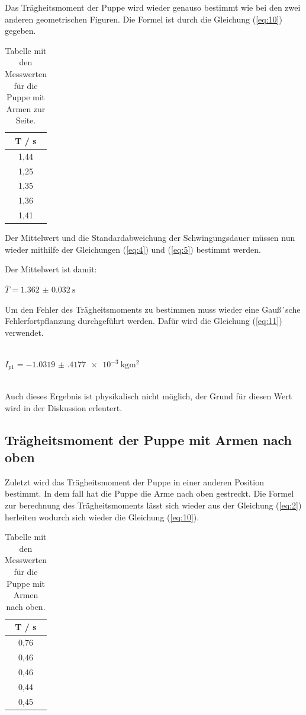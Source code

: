 Das Trägheitsmoment der Puppe wird wieder genauso bestimmt wie bei den zwei anderen
geometrischen Figuren. Die Formel ist durch die Gleichung (\ref{eq:10}) gegeben.


\begin{table}[H]
  \centering
  \caption{Tabelle mit den Messwerten für die Puppe mit Armen zur Seite.}
  \begin{tabular}{c}
    \toprule
    T / \si{\second} \\
    \midrule
    1,44 \\
    1,25 \\
    1,35 \\
    1,36 \\
    1,41 \\
    \bottomrule
  \end{tabular}
  \label{fig:tab5}
\end{table}

Der Mittelwert und die Standardabweichung der Schwingungsdauer müssen nun wieder
mithilfe der Gleichungen (\ref{eq:4}) und (\ref{eq:5}) bestimmt werden.

Der Mittelwert ist damit:

\centerline{$\bar{T} = \SI{1.362(32)}{\second}$}

Um den Fehler des Trägheitsmoments zu bestimmen muss wieder eine Gauß´sche
Fehlerfortpflanzung durchgeführt werden. Dafür wird die Gleichung (\ref{eq:11}) verwendet.\\\\


\centerline{$I_{p1} = \SI{-1.0319(4177)e-3}{\kilo\gram\meter\squared}$}\ \\

Auch dieses Ergebnis ist physikalisch nicht möglich, der Grund für diesen Wert wird
in der Diskussion erleutert.

\subsection{Trägheitsmoment der Puppe mit Armen nach oben}

Zuletzt wird das Trägheitsmoment der Puppe in einer anderen Position bestimmt. In dem
fall hat die Puppe die Arme nach oben gestreckt. Die Formel zur berechnung des
Trägheitsmoments lässt sich wieder aus der Gleichung (\ref{eq:2}) herleiten wodurch sich wieder
die Gleichung (\ref{eq:10}).



\begin{table}[H]
  \centering
  \caption{Tabelle mit den Messwerten für die Puppe mit Armen nach oben.}
  \begin{tabular}{c}
    \toprule
    T / \si{\second} \\
    \midrule
    0,76 \\
    0,46 \\
    0,46 \\
    0,44 \\
    0,45 \\
    \bottomrule
  \end{tabular}
  \label{fig:tab6}
\end{table}


